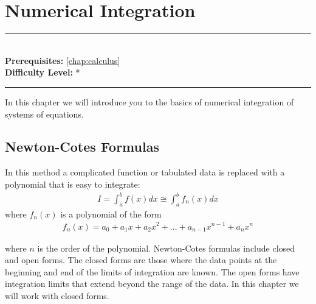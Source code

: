 \documentclass[book.tex]{subfiles}
\begin{document}
\chapter{Numerical Integration}

\label{chap:numerical_integration}
\noindent\rule{11cm}{0.4pt} \\
\textbf{Prerequisites:} \autoref{chap:calculus} \\
\textbf{Difficulty Level:} * \\
\noindent\rule{11cm}{0.4pt}
\vspace{5mm}

In this chapter we will introduce you to the basics of numerical integration of systems of equations.

\section{Newton-Cotes Formulas}
In this method a complicated function or tabulated data is replaced with a polynomial that is easy to integrate:
\begin{align}
I = \int_{a}^{b} f(x) dx \cong \int_{a}^{b} f_n(x) dx
\end{align}
where $f_n(x)$ is a polynomial of the form
\begin{align}
f_n(x) = a_0 + a_1x + a_2x^2 + ... + a_{n-1}x^{n-1} + a_nx^n
\end{align}

where $n$ is the order of the polynomial.  %
Newton-Cotes formulas include closed and open forms. The closed forms
are those where the data points at the beginning and end of the limits of integration are known. The open forms have integration limits that extend beyond the range of the data. In this chapter we will work with closed forms.
\end{document}
